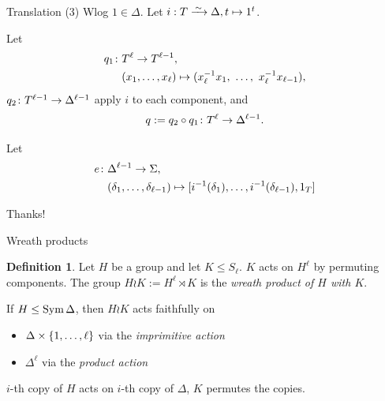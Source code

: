 \documentclass{beamer}
\theoremstyle{plain}
\theoremstyle{definition}
\newtheorem{defn}[thm]{Definition}
\begin{document}

\begin{frame}{Translation (3)}
Wlog $1 \in \Delta$.
Let $i : T \iso \Delta, t \mapsto 1 ^ t$.

\pause
Let
\begin{align*}
    q_1 \colon &T ^ \ell \rightarrow T ^ {\ell - 1},
    \\
    &(x_1, \ldots, x_{\ell})
    \mapsto
    ( x_\ell ^ {-1} x_1,~
    \ldots,~
     x_\ell ^ {-1} x_{\ell - 1}),
\end{align*}
$
    q_2 \colon T ^ {\ell - 1} \rightarrow \Delta ^ {\ell - 1}
$
apply $i$ to each component, and
\[
    q := q_2 \circ q_1 \colon T ^ \ell \rightarrow \Delta ^ {\ell - 1}.
\]

\pause
Let
\begin{align*}
    e \colon &\Delta ^ {\ell - 1} \rightarrow \Sigma,
    \\
    &(\delta_1, \ldots, \delta_{\ell - 1})
    \mapsto
    [ i ^ {-1}(\delta_1), \ldots, i ^ {-1}(\delta_{\ell - 1}), 1_T ]
\end{align*}
\end{frame}

\begin{frame}[standout]
Thanks!
\end{frame}

\printbibliography
\appendix


\begin{frame}{Wreath products}
\begin{defn}
    Let $H$ be a group and let $K \leq S_\ell$.
    $K$ acts on $H ^ \ell$ by permuting components.
    The group
    $H \wr K := H ^ \ell \rtimes K$
    is the \emph{wreath product of $H$ with $K$}.
\end{defn}

\pause
If $H \leq \operatorname{Sym} \Delta$, then $H \wr K$ acts faithfully on
\begin{itemize}
\item $\Delta \times  \left\{ 1, \ldots, \ell \right\} $ via the \emph{imprimitive action}
\item $\Delta ^ \ell$ via the \emph{product action}
\end{itemize}

$i$-th copy of $H$ acts on $i$-th copy of $\Delta$, $K$ permutes the copies.
\end{frame}

\end{document}
